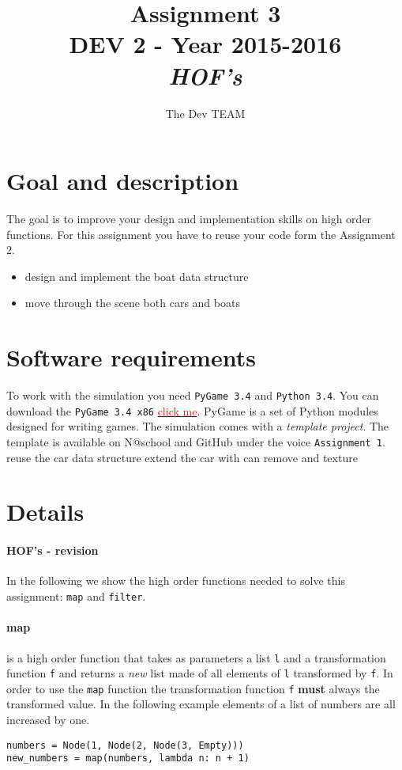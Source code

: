 \documentclass[10pt,a4paper]{article}
\begin{document}
\title{Assignment 3\\DEV 2 - Year 2015-2016\\\textit{HOF's}}
\author{The Dev TEAM}
\maketitle


\section{Goal and description}
The goal is to improve your design and implementation skills on high order functions. For this assignment you have to reuse your code form the Assignment 2.
\begin{itemize}
\item design and implement the boat data structure  
\item move through the scene both cars and boats
\end{itemize}
	
	
\section{Software requirements}
To work with the simulation you need \texttt{PyGame 3.4} and \texttt{Python 3.4}. You can download the \texttt{PyGame 3.4 x86} \href{https://bitbucket.org/pygame/pygame/downloads/pygame-1.9.2a0-hg_ea3b3bb8714a.win32-py3.4.msi}{\textcolor{red}{click me}}. PyGame is a set of Python modules designed for writing games.	The simulation comes with a \textit{template project}. The template is available on N@school and GitHub under the voice \texttt{Assignment 1}.
reuse the car data structure 
extend the car with can remove and texture
\section{Details}

\paragraph{HOF's - revision}
In the following we show the high order functions needed to solve this assignment: \texttt{map} and \texttt{filter}. 

\paragraph{map} is a high order function that takes as parameters a list \texttt{l} and a transformation function \texttt{f} and returns a \textit{new} list made of all elements of \texttt{l} transformed by \texttt{f}. In order to use the \texttt{map} function the transformation function \texttt{f} \textbf{must} always the transformed value. In the following example elements of a list of numbers are all increased by one.
\begin{lstlisting}[frame=single]
numbers = Node(1, Node(2, Node(3, Empty)))
new_numbers = map(numbers, lambda n: n + 1)
\end{lstlisting}
\end{document}
